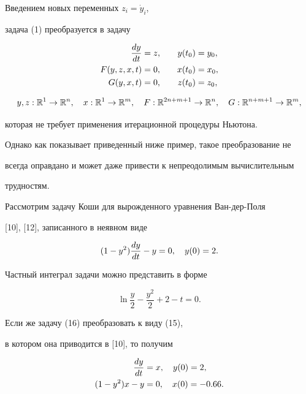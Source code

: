 \begin{note} Введением новых переменных $z_i=\Dot y_i$,


задача (1) преобразуется в задачу


\begin{alignat}{2}


\derhd{y}{t}&=z, &\quad y(t_0)&=y_0,\notag\\


F(y,z,x,t)&=0, &\quad x(t_0)&=x_0,\\


G(y,x,t)&=0, &\quad z(t_0)&=z_0,\notag


\end{alignat}


$$


y,z: \R^1\to \R^n,\quad x: \R^1\to \R^m,


\quad F:\R^{2n+m+1}\to \R^n,\quad G:\R^{n+m+1}\to \R^m,


$$


которая не требует применения итерационной процедуры Ньютона.


Однако как показывает приведенный ниже пример, такое преобразование не


всегда оправдано и может даже привести к непреодолимым вычислительным


трудностям.


\end{note}





Рассмотрим задачу Коши для вырожденного уравнения Ван-дер-Поля


[10], [12], записанного в неявном виде


\begin{equation}


(1-y^2)\derhd{y}{t}-y=0,\quad y(0)=2.


\end{equation}


Частный интеграл задачи можно представить в форме


$$


\ln\frac{y}{2}-\frac{y^2}{2}+2-t=0.


$$





Если же задачу (16) преобразовать к виду (15),


в котором она приводится в [10], то получим


\begin{equation}


\begin{split}


\derhd{y}{t}&=x,\quad y(0)=2,\\


(1-y^2)x-y&=0,\quad x(0)=-0.66.


\end{split}


\end{equation}


